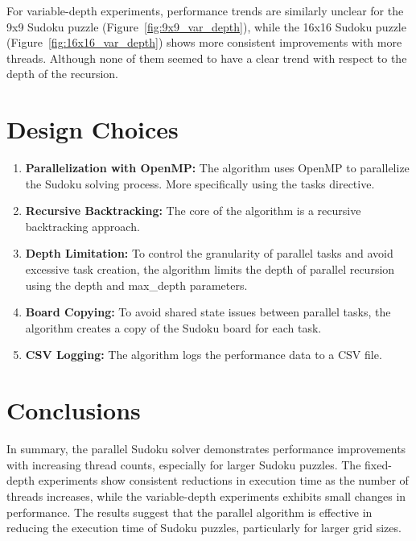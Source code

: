 \documentclass[a4paper,10pt]{article}
\begin{document}
\begin{multicols}{2}
For variable-depth experiments, performance trends are similarly unclear for the 9x9 Sudoku puzzle (Figure~\ref{fig:9x9_var_depth}), while the 16x16 Sudoku puzzle (Figure~\ref{fig:16x16_var_depth}) shows more consistent improvements with more threads. Although none of them seemed to have a clear trend with respect to the depth of the recursion.

\section{Design Choices}

\begin{enumerate}
    \item \textbf{Parallelization with OpenMP:} The algorithm uses OpenMP to parallelize the Sudoku solving process. More specifically using the tasks directive.
    \item \textbf{Recursive Backtracking:} The core of the algorithm is a recursive backtracking approach.
    \item \textbf{Depth Limitation:} To control the granularity of parallel tasks and avoid excessive task creation, the algorithm limits the depth of parallel recursion using the depth and max\_depth parameters.
    \item \textbf{Board Copying:} To avoid shared state issues between parallel tasks, the algorithm creates a copy of the Sudoku board for each task.
    \item \textbf{CSV Logging:} The algorithm logs the performance data to a CSV file.
\end{enumerate}

\section{Conclusions}

In summary, the parallel Sudoku solver demonstrates performance improvements with increasing thread counts, especially for larger Sudoku puzzles. The fixed-depth experiments show consistent reductions in execution time as the number of threads increases, while the variable-depth experiments exhibits small changes in performance. The results suggest that the parallel algorithm is effective in reducing the execution time of Sudoku puzzles, particularly for larger grid sizes.

\end{multicols}
\end{document}
